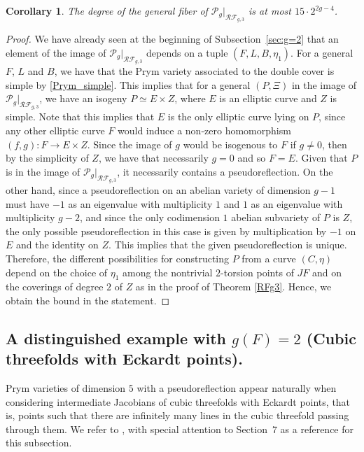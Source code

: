 \documentclass[preprint,12pt]{amsart}
\def\cF{\ensuremath{\mathcal{F}}}
\def\cP{\ensuremath{\mathcal{P}}}
\def\cR{\ensuremath{\mathcal{R}}}
\theoremstyle{plain}
\newtheorem{corollary}[corollary]{Corollary}
\theoremstyle{definition}
\begin{document}
\begin{corollary}
The degree of the general fiber of $\cP_g|_{\cR\cF_{g,3}}$ is at most $15\cdot 2^{2g-4}$.
\end{corollary}
\begin{proof}
We have already seen at the beginning of Subsection~\ref{sec:g=2} that an element of the image of $\cP_g|_{\cR\cF_{g,3}}$ depends on a tuple $(F,L,B,\eta_1)$.
For a general $F$, $L$ and $B$, we have that the Prym variety associated to the double cover is simple by \autoref{Prym_simple}.
This implies that for a general $(P,\Xi)$ in the image of $\cP_g|_{\cR\cF_{g,3}}$, we have an isogeny $P\simeq E\times Z$, where $E$ is an elliptic curve and $Z$ is simple. Note that this implies that $E$ is the only elliptic curve lying on $P$, since any other elliptic curve $F$ would induce a non-zero homomorphism $(f,g):F\to E\times Z$. Since the image of $g$ would be isogenous to $F$ if $g\neq 0$, then by the simplicity of $Z$, we have that necessarily $g=0$ and so $F=E$. Given that $P$ is in the image of $\cP_g|_{\cR\cF_{g,3}}$, it necessarily contains a pseudoreflection. On the other hand, since a pseudoreflection on an abelian variety of dimension $g-1$ must have $-1$ as an eigenvalue with multiplicity $1$ and $1$ as an eigenvalue with multiplicity $g-2$, and since the only codimension $1$ abelian subvariety of $P$ is $Z$, the only possible pseudoreflection in this case is given by multiplication by $-1$ on $E$ and the identity on $Z$. This implies that the given pseudoreflection is unique.
Therefore, the different possibilities for constructing $P$ from a curve $(C,\eta)$ depend  on the choice of $\eta_1$ among the nontrivial $2$-torsion points of $JF$ and on the coverings of degree $2$ of $Z$ as in the proof of Theorem \ref{RFg3}. Hence, we obtain the bound in the statement.
\end{proof}

\subsection{A distinguished example with \texorpdfstring{$g(F)=2$}{g(F)=2} (Cubic threefolds with Eckardt points).}\label{Eckardt}
Prym varieties of dimension $5$ with a pseudoreflection appear naturally when considering intermediate Jacobians of cubic threefolds with Eckardt points, that is, points such that there are infinitely many lines in the cubic threefold passing through them.
We refer to \cite{CZ}, with special attention to Section~7 as a reference for this subsection.
\end{document}
